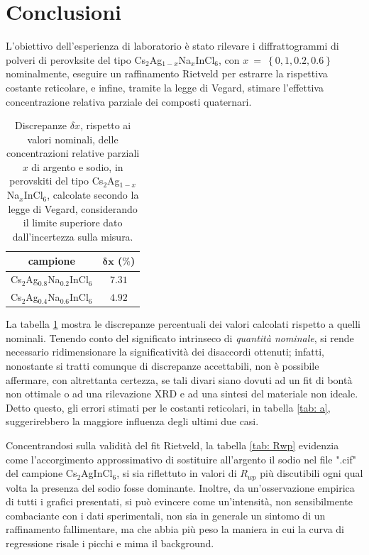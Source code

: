 \documentclass[a4paper,twocolumn,12 pt]{article}
\begin{document}
\section*{Conclusioni}
L'obiettivo dell'esperienza di laboratorio è stato rilevare i diffrattogrammi di polveri di perovksite del tipo Cs$_2$Ag$_{1-x}$Na$_{x}$InCl$_6$, con $x~=~\left\{ 0, 1, 0.2, 0.6 \right\}$ nominalmente, eseguire un raffinamento Rietveld per estrarre la rispettiva costante reticolare, e infine, tramite la legge di Vegard, stimare l'effettiva concentrazione relativa parziale dei composti quaternari.
\begin{center}
\begin{table}[htbp]\setlength\belowcaptionskip{-20pt}
    \centering
\begin{tabular}{cc}
    \hline
    \textbf{campione} & $\mathbf{\delta x}$ ($\%$)\\
    \hline
    Cs$_2$Ag$_{0.8}$Na$_{0.2}$InCl$_6$ & $7.31$\\
    Cs$_2$Ag$_{0.4}$Na$_{0.6}$InCl$_6$ & $4.92$\\
    \hline
\end{tabular}
\caption{Discrepanze $\delta x$, rispetto ai valori nominali, delle concentrazioni relative parziali $x$ di argento e sodio, in perovskiti del tipo Cs$_2$Ag$_{1-x}$Na$_{x}$InCl$_6$, calcolate secondo la legge di Vegard, considerando il limite superiore dato dall'incertezza sulla misura.}
\label{tab: discr x}
\end{table}
\end{center}

La tabella \ref{tab: discr x} mostra le discrepanze percentuali dei valori calcolati rispetto a quelli nominali. Tenendo conto del significato intrinseco di \emph{quantità nominale}, si rende necessario ridimensionare la significatività dei disaccordi ottenuti; infatti, nonostante si tratti comunque di discrepanze accettabili, non è possibile affermare, con altrettanta certezza, se tali divari siano dovuti ad un fit di bontà non ottimale o ad una rilevazione XRD e ad una sintesi del materiale non ideale. Detto questo, gli errori stimati per le costanti reticolari, in tabella \ref{tab: a}, suggerirebbero la maggiore influenza degli ultimi due casi.

Concentrandosi sulla validità del fit Rietveld, la tabella \ref{tab: Rwp} evidenzia come l'accorgimento approssimativo di sostituire all'argento il sodio nel file ".cif" del campione Cs$_2$AgInCl$_6$, si sia riflettuto in valori di $R_{wp}$ più discutibili ogni qual volta la presenza del sodio fosse dominante. Inoltre, da un'osservazione empirica di tutti i grafici presentati, si può evincere come un'intensità, non sensibilmente combaciante con i dati sperimentali, non sia in generale un sintomo di un raffinamento fallimentare, ma che abbia più peso la maniera in cui la curva di regressione risale i picchi e mima il background.
\end{document}
